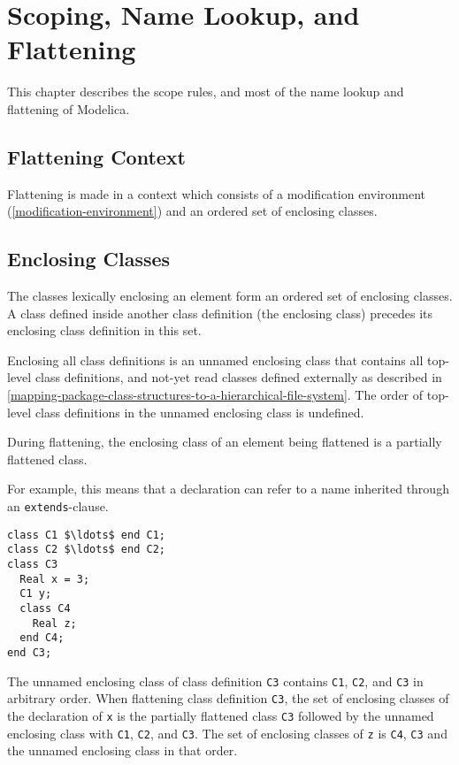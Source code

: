 \chapter{Scoping, Name Lookup, and Flattening}\label{scoping-name-lookup-and-flattening}

This chapter describes the scope rules, and most of the name lookup and flattening of Modelica.


\section{Flattening Context}\label{flattening-context}

Flattening is made in a context which consists of a modification environment (\cref{modification-environment}) and an ordered set of enclosing classes.


\section{Enclosing Classes}\label{enclosing-classes}

The classes lexically enclosing an element form an ordered set of enclosing classes.
A class defined inside another class definition (the enclosing class) precedes its enclosing class definition in this set.

Enclosing all class definitions is an unnamed enclosing class that contains all top-level class definitions, and not-yet read classes defined externally as described in \cref{mapping-package-class-structures-to-a-hierarchical-file-system}.
The order of top-level class definitions in the unnamed enclosing class is undefined.

During flattening, the enclosing class of an element being flattened is a partially flattened class.

\begin{nonnormative}
For example, this means that a declaration can refer to a name inherited through an \lstinline!extends!-clause.
\end{nonnormative}

\begin{example}
\begin{lstlisting}[language=modelica]
class C1 $\ldots$ end C1;
class C2 $\ldots$ end C2;
class C3
  Real x = 3;
  C1 y;
  class C4
    Real z;
  end C4;
end C3;
\end{lstlisting}

The unnamed enclosing class of class definition \lstinline!C3! contains \lstinline!C1!, \lstinline!C2!, and \lstinline!C3! in arbitrary order.
When flattening class definition \lstinline!C3!, the set of enclosing classes of the declaration of \lstinline!x! is the partially flattened class \lstinline!C3! followed by the unnamed enclosing class with \lstinline!C1!, \lstinline!C2!, and \lstinline!C3!.
The set of enclosing classes of \lstinline!z! is \lstinline!C4!, \lstinline!C3! and the unnamed enclosing class in that order.
\end{example}


